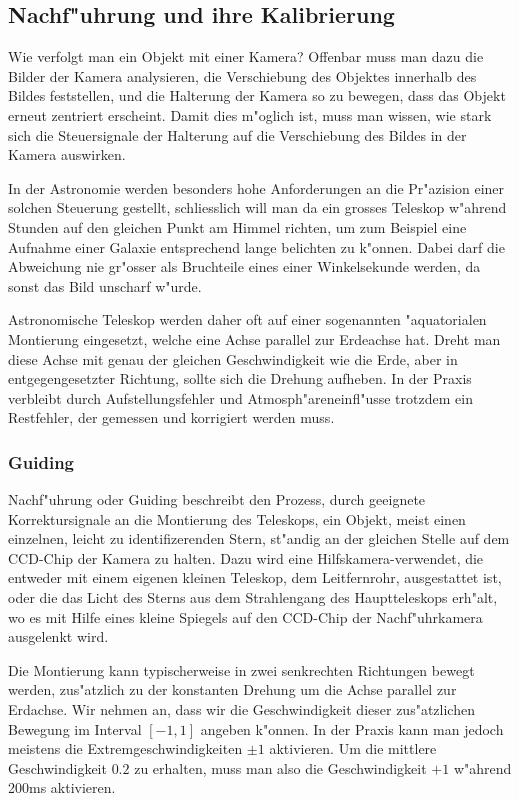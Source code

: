 %
%
%
\subsection{Nachf"uhrung und ihre Kalibrierung}
Wie verfolgt man ein Objekt mit einer Kamera?
Offenbar muss man dazu
die Bilder der Kamera analysieren, die Verschiebung des Objektes innerhalb
des Bildes feststellen, und die Halterung der Kamera so zu bewegen,
dass das Objekt erneut zentriert erscheint.
Damit dies m"oglich ist, muss man wissen, wie stark sich die Steuersignale
der Halterung auf die Verschiebung des Bildes in der Kamera auswirken.

In der Astronomie werden besonders hohe Anforderungen an die Pr"azision
einer solchen Steuerung gestellt, schliesslich will man da ein grosses
Teleskop w"ahrend Stunden auf den gleichen Punkt am Himmel richten, um
zum Beispiel eine Aufnahme einer Galaxie entsprechend lange belichten
zu k"onnen.
Dabei darf die Abweichung nie gr"osser als Bruchteile eines
einer Winkelsekunde werden, da sonst das Bild unscharf w"urde.

Astronomische Teleskop werden daher oft auf einer sogenannten
"aquatorialen Montierung eingesetzt, welche eine Achse parallel
zur Erdeachse hat. Dreht man diese Achse mit genau der gleichen
Geschwindigkeit wie die Erde, aber in entgegengesetzter Richtung,
sollte sich die Drehung aufheben. In der Praxis verbleibt durch
Aufstellungsfehler und Atmosph"areneinfl"usse trotzdem ein Restfehler,
der gemessen und korrigiert werden muss.

\subsubsection{Guiding}
Nachf"uhrung oder Guiding beschreibt den Prozess, durch geeignete
Korrektursignale an die Montierung des Teleskops, ein Objekt, meist
einen einzelnen, leicht zu identifizerenden Stern, st"andig an der
gleichen Stelle auf dem CCD-Chip der Kamera zu halten. Dazu wird
eine Hilfskamera-verwendet, die entweder mit einem eigenen kleinen
Teleskop, dem Leitfernrohr, ausgestattet ist, oder die das Licht
des Sterns aus dem Strahlengang des Hauptteleskops erh"alt, wo
es mit Hilfe eines kleine Spiegels auf den CCD-Chip der Nachf"uhrkamera
ausgelenkt wird.

Die Montierung kann typischerweise in zwei senkrechten Richtungen
bewegt werden, zus"atzlich zu der konstanten Drehung um die
Achse parallel zur Erdachse.
Wir nehmen an, dass wir die Geschwindigkeit
dieser zus"atzlichen Bewegung im Interval $[-1,1]$ angeben k"onnen.
In der Praxis kann man jedoch meistens die Extremgeschwindigkeiten
$\pm 1$ aktivieren. Um die mittlere Geschwindigkeit $0.2$ zu erhalten,
muss man also die Geschwindigkeit $+1$ w"ahrend 200ms aktivieren.

